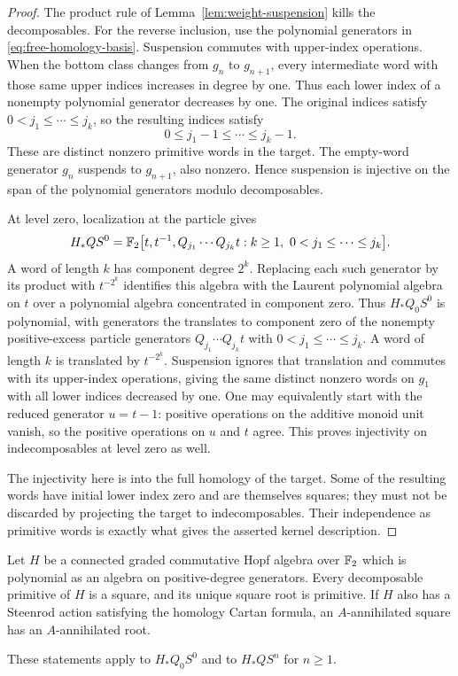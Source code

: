 \begin{proof}
The product rule of Lemma~\ref{lem:weight-suspension} kills the
decomposables. For the reverse inclusion, use the polynomial
generators in \eqref{eq:free-homology-basis}. Suspension commutes
with upper-index operations. When the bottom class changes from
$g_n$ to $g_{n+1}$, every intermediate word with those same upper
indices increases in degree by one. Thus each lower index of a
nonempty polynomial generator decreases by one. The original
indices satisfy $0<j_1\leq\cdots\leq j_k$, so the resulting
indices satisfy
\[
 0\leq j_1-1\leq\cdots\leq j_k-1.
\]
These are distinct nonzero primitive words in the target. The
empty-word generator $g_n$ suspends to $g_{n+1}$, also nonzero.
Hence suspension is injective on the span of the polynomial
generators modulo decomposables.

At level zero, localization at the particle gives
\[
 H_*QS^0=\mathbb F_2\bigl[t,t^{-1},
 Q_{j_1}\cdots Q_{j_k}t:
 k\geq1,\ 0<j_1\leq\cdots\leq j_k\bigr].
\]
A word of length $k$ has component degree $2^k$. Replacing each
such generator by its product with $t^{-2^k}$ identifies this algebra
with the Laurent polynomial algebra on $t$ over a polynomial algebra
concentrated in component zero. Thus $H_*Q_0S^0$ is polynomial,
with generators the translates to component zero
of the nonempty positive-excess particle generators
$Q_{j_1}\cdots Q_{j_k}t$ with
$0<j_1\leq\cdots\leq j_k$. A word of length $k$ is translated
by $t^{-2^k}$. Suspension ignores that translation and commutes
with its upper-index operations, giving the same distinct
nonzero words on $g_1$ with all lower indices decreased by one.
One may equivalently start with the reduced generator $u=t-1$:
positive operations on the additive monoid unit vanish, so the
positive operations on $u$ and $t$ agree. This proves injectivity
on indecomposables at level zero as well.

The injectivity here is into the full homology of the target.
Some of the resulting words have initial lower index zero and
are themselves squares; they must not be discarded by projecting
the target to indecomposables. Their independence as primitive
words is exactly what gives the asserted kernel description.
\end{proof}

\begin{lemma}\label{lem:primitive-roots}
Let $H$ be a connected graded commutative Hopf algebra over $\mathbb F_2$
which is polynomial as an algebra on positive-degree generators.
Every decomposable primitive of $H$ is a square, and its unique
square root is primitive. If $H$ also has a Steenrod action
satisfying the homology Cartan formula, an $A$-annihilated square
has an $A$-annihilated root.

These statements apply to $H_*Q_0S^0$ and to $H_*QS^n$ for
$n\geq1$.
\end{lemma}

